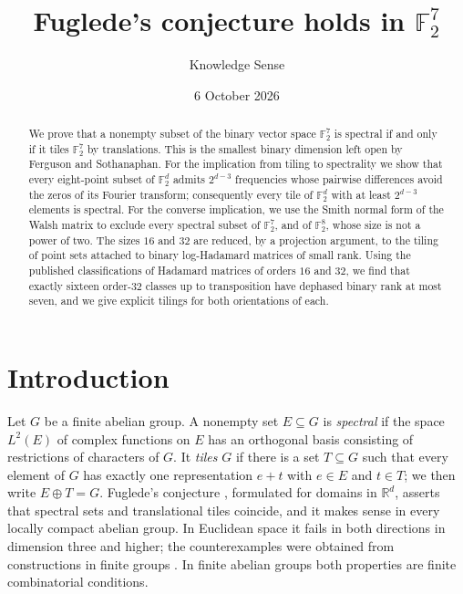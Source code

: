 \documentclass[11pt]{amsart}
\theoremstyle{definition}
\theoremstyle{remark}
\numberwithin{equation}{section}
\numberwithin{table}{section}
\newcommand{\F}{\mathbb{F}}
\begin{document}
\title[Fuglede's conjecture in $\mathbb{F}_2^7$]{Fuglede's conjecture holds in $\mathbb{F}_2^7$}
\author{Knowledge Sense}
\address{Knowledge Sense}
\date{6 October 2026}

\begin{abstract}
We prove that a nonempty subset of the binary vector space $\F_2^7$ is spectral if and only if it tiles $\F_2^7$ by translations. This is the smallest binary dimension left open by Ferguson and Sothanaphan. For the implication from tiling to spectrality we show that every eight-point subset of $\F_2^d$ admits $2^{d-3}$ frequencies whose pairwise differences avoid the zeros of its Fourier transform; consequently every tile of $\F_2^d$ with at least $2^{d-3}$ elements is spectral. For the converse implication, we use the Smith normal form of the Walsh matrix to exclude every spectral subset of $\F_2^7$, and of $\F_2^8$, whose size is not a power of two. The sizes $16$ and $32$ are reduced, by a projection argument, to the tiling of point sets attached to binary log-Hadamard matrices of small rank. Using the published classifications of Hadamard matrices of orders $16$ and $32$, we find that exactly sixteen order-$32$ classes up to transposition have dephased binary rank at most seven, and we give explicit tilings for both orientations of each.
\end{abstract}


\maketitle

\section{Introduction}\label{sec:intro}

Let $G$ be a finite abelian group. A nonempty set $E\subseteq G$ is \emph{spectral} if the space $L^2(E)$ of complex functions on $E$ has an orthogonal basis consisting of restrictions of characters of $G$. It \emph{tiles} $G$ if there is a set $T\subseteq G$ such that every element of $G$ has exactly one representation $e+t$ with $e\in E$ and $t\in T$; we then write $E\oplus T=G$. Fuglede's conjecture \cite{Fug74}, formulated for domains in $\mathbb{R}^d$, asserts that spectral sets and translational tiles coincide, and it makes sense in every locally compact abelian group. In Euclidean space it fails in both directions in dimension three and higher; the counterexamples were obtained from constructions in finite groups \cite{Tao04,KM06tiles,KM06hadamard,Mat05,FMM06}. In finite abelian groups both properties are finite combinatorial conditions.
\end{document}

